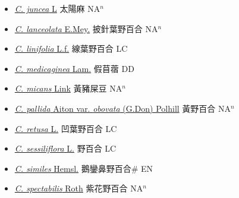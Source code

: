 \begin{itemize}
\begin{itemize}
        \item[] \href{http://www.theplantlist.org/tpl1.1/search?q=Crotalaria+juncea}{\textit{C. juncea} L}   太陽麻 NA$^n$
        \item[] \href{http://www.theplantlist.org/tpl1.1/search?q=Crotalaria+lanceolata}{\textit{C. lanceolata} E.Mey.}   披針葉野百合 NA$^n$
        \item[] \href{http://www.theplantlist.org/tpl1.1/search?q=Crotalaria+linifolia}{\textit{C. linifolia} L.f.}   線葉野百合 LC
        \item[] \href{http://www.theplantlist.org/tpl1.1/search?q=Crotalaria+medicaginea}{\textit{C. medicaginea} Lam.}   假苜蓿 DD
        \item[] \href{http://www.theplantlist.org/tpl1.1/search?q=Crotalaria+micans}{\textit{C. micans} Link}   黃豬屎豆 NA$^n$
        \item[] \href{http://www.theplantlist.org/tpl1.1/search?q=Crotalaria+pallida+var.+obovata}{\textit{C. pallida} Aiton var. \textit{obovata} (G.Don) Polhill}   黃野百合 NA$^n$
        \item[] \href{http://www.theplantlist.org/tpl1.1/search?q=Crotalaria+retusa}{\textit{C. retusa} L.}   凹葉野百合 LC
        \item[] \href{http://www.theplantlist.org/tpl1.1/search?q=Crotalaria+sessiliflora}{\textit{C. sessiliflora} L.}   野百合 LC
        \item[] \href{http://www.theplantlist.org/tpl1.1/search?q=Crotalaria+similes}{\textit{C. similes} Hemsl.}   鵝鑾鼻野百合\# EN
        \item[] \href{http://www.theplantlist.org/tpl1.1/search?q=Crotalaria+spectabilis}{\textit{C. spectabilis} Roth}   紫花野百合 NA$^n$

\end{itemize}
\end{itemize}
